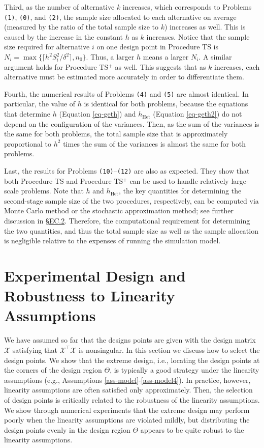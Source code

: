 \documentclass[ijoc,nonblindrev]{informs3}
\def\cX{{\mathcal X}}
\def\hhet{h_{\mathrm{Het}}}
\begin{document}
Third, as the number of alternative $k$ increases, which corresponds to Problems \texttt{(1)}, \texttt{(0)}, and \texttt{(2)},
the sample size allocated to each alternative on average (measured by the ratio of  the total sample size to $k$) increases as well.
This is caused by the increase in the constant $h$ as $k$ increases.
Notice that the sample size required for alternative $i$ on one design point in Procedure TS is $N_i =\max\{\lceil h^2S_i^2/\delta^2\rceil, n_0\}$.
Thus, a larger $h$ means  a larger $N_i$. A similar argument holds for Procedure TS$^+$ as well.
This suggests that as $k$ increases, each alternative must be estimated more accurately in order to differentiate them.


Fourth, the numerical results of Problems \texttt{(4)} and \texttt{(5)} are almost identical.
In particular, the value of $h$ is identical for both problems,
because  the equations that determine $h$ (Equation \eqref{eq-geth}) and $\hhet$ (Equation \eqref{eq-geth2}) do not depend on the configuration of the variances.
Then, as the sum of the variances is the same for both problems, the total sample size that is approximately proportional to $h^2$ times the sum of the variances is almost the same for both problems.


Last, the results for Problems \texttt{(10)}--\texttt{(12)} are also as expected.
They show that both Procedure TS and Procedure TS$^+$ can be used to handle relatively large-scale problems.
Note that $h$ and $h_{\mathrm{Het}}$, the key quantities for determining the second-stage sample size of the two procedures, respectively, can be computed via Monte Carlo method or the stochastic approximation method; see further discussion in \S\hyperlink{EC.2}{EC.2}.
Therefore, the computational requirement for determining the two quantities, and thus the total sample size as well as the sample allocation is negligible relative to the expenses of running the simulation model.



\section{Experimental Design and Robustness to Linearity Assumptions}\label{sec-robust}

We have assumed so far that the designs points are given with the design matrix $\cX$ satisfying that $\cX^\intercal\cX$ is nonsingular.
In this section we discuss how to select the design points.
We show that the extreme design, i.e., locating the design points at the corners of the design region $\Theta$, is typically a good strategy under the linearity assumptions (e.g., Assumptions \ref{ass-model}-\ref{ass-model4}).
In practice, however, linearity assumptions are often satisfied only approximately.
Then, the selection of design points is critically related to the robustness of the linearity assumptions.
We show through numerical experiments that the extreme design may perform poorly when the linearity assumptions are violated mildly,
but distributing the design points evenly in the design region $\Theta$ appears to be quite robust to the linearity assumptions.
\end{document}
